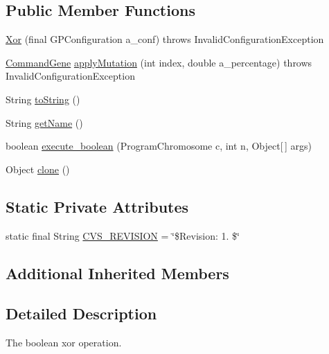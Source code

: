 \subsection*{Public Member Functions}
\begin{DoxyCompactItemize}
\item 
\hyperlink{classorg_1_1jgap_1_1gp_1_1function_1_1_xor_abad93928ac54a6e0083234f6c8d4d016}{Xor} (final G\-P\-Configuration a\-\_\-conf)  throws Invalid\-Configuration\-Exception 
\item 
\hyperlink{classorg_1_1jgap_1_1gp_1_1_command_gene}{Command\-Gene} \hyperlink{classorg_1_1jgap_1_1gp_1_1function_1_1_xor_a183aabff68bad20a2538c0c417dbdef6}{apply\-Mutation} (int index, double a\-\_\-percentage)  throws Invalid\-Configuration\-Exception 
\item 
String \hyperlink{classorg_1_1jgap_1_1gp_1_1function_1_1_xor_a0e64b9a6e0b7447482480fbfa0ba77b5}{to\-String} ()
\item 
String \hyperlink{classorg_1_1jgap_1_1gp_1_1function_1_1_xor_ae1388fa6142f0d5f274aef521d0fa783}{get\-Name} ()
\item 
boolean \hyperlink{classorg_1_1jgap_1_1gp_1_1function_1_1_xor_a2e69ee2f2320a3c1d68c000721bf0c82}{execute\-\_\-boolean} (Program\-Chromosome c, int n, Object\mbox{[}$\,$\mbox{]} args)
\item 
Object \hyperlink{classorg_1_1jgap_1_1gp_1_1function_1_1_xor_a6019940ccbebc0563f052a9cb3131309}{clone} ()
\end{DoxyCompactItemize}
\subsection*{Static Private Attributes}
\begin{DoxyCompactItemize}
\item 
static final String \hyperlink{classorg_1_1jgap_1_1gp_1_1function_1_1_xor_a5b0b747f4b1a227d19734b5cbace116c}{C\-V\-S\-\_\-\-R\-E\-V\-I\-S\-I\-O\-N} = \char`\"{}\$Revision\-: 1. \$\char`\"{}
\end{DoxyCompactItemize}
\subsection*{Additional Inherited Members}


\subsection{Detailed Description}
The boolean xor operation.

